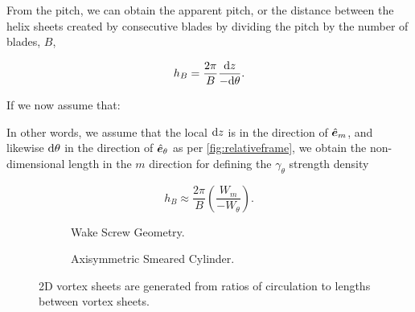 %

\noindent From the pitch, we can obtain the apparent pitch, or the distance between the helix sheets created by consecutive blades by dividing the pitch by the number of blades, \(B\),

\begin{equation}
    h_B = \frac{2\pi}{B}  \frac{\mathrm{d} z}{-\mathrm{d} \theta}.
\end{equation}

If we now assume that:

\begin{assumption}




\end{assumption}

\noindent In other words, we assume that the local \(\mathrm{d} z\) is in the direction of \(\hat{\bm{e}}_m\), and likewise \(\mathrm{d}\theta\) in the direction of \(\hat{\bm{e}}_\theta\) as per \cref{fig:relativeframe}, we obtain the non-dimensional length in the \(m\) direction for defining the \(\gamma_\theta\) strength density

\begin{equation}
    h_B \approx \frac{2\pi}{B} \left(\frac{W_m}{-W_\theta}\right).
\end{equation}

\begin{figure}[htb]
     \centering
     \begin{subfigure}[t]{0.45\textwidth}
        \centering
        
        \caption{Wake Screw Geometry.}
        \label{}
     \end{subfigure}
     \hfill
     \begin{subfigure}[t]{0.45\textwidth}
         \centering
        
        \caption{Axisymmetric Smeared Cylinder.}
        \label{}
     \end{subfigure}
     \caption[Smeared vortex sheets.]{2D vortex sheets are generated from ratios of circulation to lengths between vortex sheets.}
    \label{fig:smearscrew}
\end{figure}


